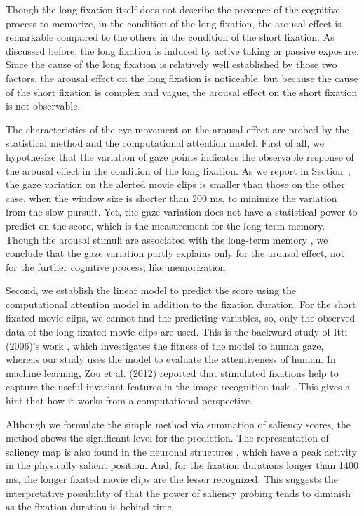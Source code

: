 \documentclass[10pt,letterpaper]{article}
\begin{document}
Though the long fixation itself does not describe the presence of the cognitive process to memorize, in the condition of the long fixation, the arousal effect is remarkable compared to the others in the condition of the short fixation. As discussed before, the long fixation is induced by active taking or passive exposure. Since the cause of the long fixation is relatively well established by those two factors, the arousal effect on the long fixation is noticeable, but because the cause of the short fixation is complex and vague, the arousal effect on the short fixation is not observable.

The characteristics of the eye movement on the arousal effect are probed by the statistical method and the computational attention model. First of all, we hypothesize that the variation of gaze points indicates the observable response of the arousal effect in the condition of the long fixation. As we report in Section~, the gaze variation on the alerted movie clips is smaller than those on the other case, when the window size is shorter than 200 ms, to minimize the variation from the slow pursuit. Yet, the gaze variation does not have a statistical power to predict on the score, which is the measurement for the long-term memory. Though the arousal stimuli are associated with the long-term memory \cite{Cahill1996amyg,Cahill1998baso}, we conclude that the gaze variation partly explains only for the arousal effect, not for the further cognitive process, like memorization.

Second, we establish the linear model to predict the score using the computational attention model \cite{itti1998model} in addition to the fixation duration. For the short fixated movie clips, we cannot find the predicting variables, so, only the observed data of the long fixated movie clips are used. This is the backward study of Itti (2006)’s work \cite{Itti2006}, which investigates the fitness of the model to human gaze, whereas our study uses the model to evaluate the attentiveness of human. In machine learning, Zou et al. (2012) reported that stimulated fixations help to capture the useful invariant features in the image recognition task \cite{Zou2012}. This gives a hint that how it works from a computational perspective.

Although we formulate the simple method via summation of saliency scores, the method shows the significant level for the prediction. The representation of saliency map is also found in the neuronal structures \cite{Fecteau2006}, which have a peak activity in the physically salient position. And, for the fixation durations longer than 1400 ms, the longer fixated movie clips are the lesser recognized. This suggests the interpretative possibility of that the power of saliency probing tends to diminish as the fixation duration is behind time.
\end{document}

